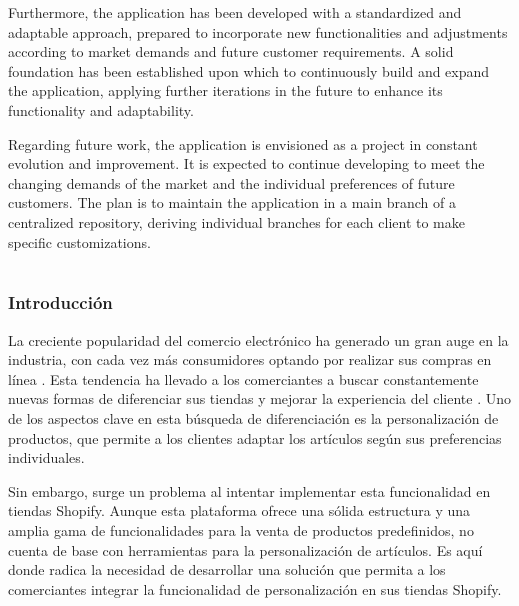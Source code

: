 \documentclass[11pt]{article}
\renewcommand\thesection{\Roman{section}}
\renewcommand\thesubsection{\thesection.\Roman{subsection}} %
\begin{document}
Furthermore, the application has been developed with a standardized and adaptable approach, prepared to incorporate new functionalities 
and adjustments according to market demands and future customer requirements. A solid foundation has been established upon which to 
continuously build and expand the application, applying further iterations in the future to enhance its functionality and adaptability.

Regarding future work, the application is envisioned as a project in constant evolution and improvement. It is expected to continue 
developing to meet the changing demands of the market and the individual preferences of future customers. The plan is to maintain 
the application in a main branch of a centralized repository, deriving individual branches for each client to make specific customizations.

\cleardoublepage

\part*{}
\renewcommand\thesection{\arabic{section}}
\renewcommand\thesubsection{\thesection.\arabic{subsection}} %
\setcounter{page}{1} %
\setcounter{section}{0} %
\makeatletter
{} %
\makeatother



\section{Introducción}
La creciente popularidad del comercio electrónico ha generado un gran auge en la industria, con cada vez más consumidores optando por realizar 
sus compras en línea \cite{crecimiento-ecomerce}. Esta tendencia ha llevado a los comerciantes a buscar constantemente nuevas formas de diferenciar sus tiendas y mejorar 
la experiencia del cliente \cite{diferenciacion}. Uno de los aspectos clave en esta búsqueda de diferenciación es la personalización de productos, que permite a los 
clientes adaptar los artículos según sus preferencias individuales.

Sin embargo, surge un problema al intentar implementar esta funcionalidad en tiendas Shopify. Aunque esta plataforma ofrece una sólida estructura 
y una amplia gama de funcionalidades para la venta de productos predefinidos, no cuenta de base con herramientas para la personalización de artículos.
Es aquí donde radica la necesidad de desarrollar una solución que permita a los comerciantes integrar la funcionalidad de personalización en sus tiendas Shopify.
\end{document}
